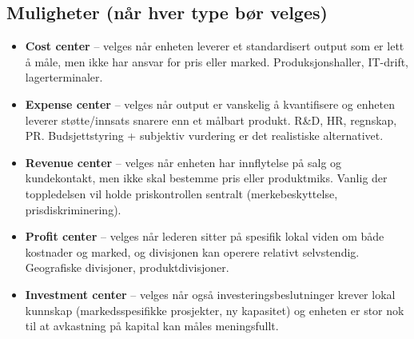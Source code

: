 \subsection*{Muligheter (når hver type bør velges)}
\begin{itemize}
\item \textbf{Cost center} -- velges når enheten leverer et standardisert output som er lett å måle, men ikke har ansvar for pris eller marked. Produksjonshaller, IT-drift, lagerterminaler.
\item \textbf{Expense center} -- velges når output er vanskelig å kvantifisere og enheten leverer støtte/innsats snarere enn et målbart produkt. R\&D, HR, regnskap, PR. Budsjettstyring + subjektiv vurdering er det realistiske alternativet.
\item \textbf{Revenue center} -- velges når enheten har innflytelse på salg og kundekontakt, men ikke skal bestemme pris eller produktmiks. Vanlig der toppledelsen vil holde priskontrollen sentralt (merkebeskyttelse, prisdiskriminering).
\item \textbf{Profit center} -- velges når lederen sitter på spesifik lokal viden om både kostnader og marked, og divisjonen kan operere relativt selvstendig. Geografiske divisjoner, produktdivisjoner.
\item \textbf{Investment center} -- velges når også investeringsbeslutninger krever lokal kunnskap (markedsspesifikke prosjekter, ny kapasitet) og enheten er stor nok til at avkastning på kapital kan måles meningsfullt.
\end{itemize}

